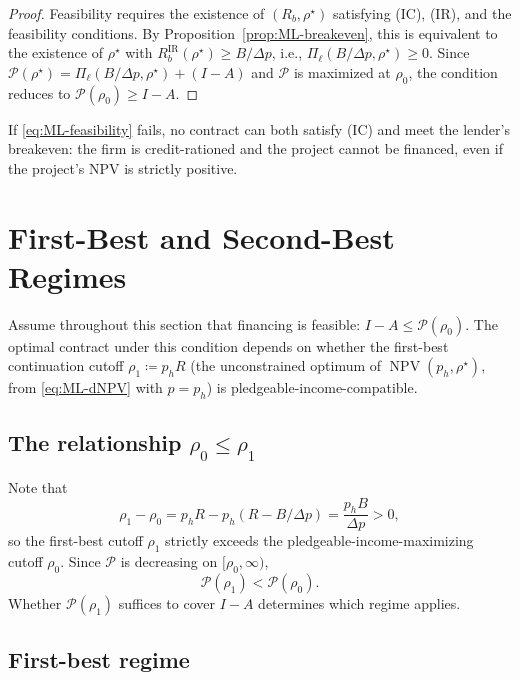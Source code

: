 \documentclass[11pt,a4paper,oneside]{book}
\def\leq{\leqslant}
\def\geq{\geqslant}
\DeclareMathOperator{\NPV}{NPV}
\newcommand{\IR}{\mathrm{IR}}
\theoremstyle{plain}
\theoremstyle{definition}
\theoremstyle{remark}
\numberwithin{equation}{chapter}
\begin{document}
\begin{proof}
Feasibility requires the existence of $(R_b, \rho^\star)$ satisfying (IC), (IR), and the feasibility conditions.
By Proposition~\ref{prop:ML-breakeven}, this is equivalent to the existence of $\rho^\star$ with $R_b^{\IR}(\rho^\star) \geq B/\Delta p$, i.e., $\Pi_\ell(B/\Delta p, \rho^\star) \geq 0$.
Since $\mathcal{P}(\rho^\star) = \Pi_\ell(B/\Delta p, \rho^\star) + (I - A)$ and $\mathcal{P}$ is maximized at $\rho_0$, the condition reduces to $\mathcal{P}(\rho_0) \geq I - A$.
\end{proof}

If \eqref{eq:ML-feasibility} fails, no contract can both satisfy (IC) and meet the lender's breakeven: the firm is credit-rationed and the project cannot be financed, even if the project's NPV is strictly positive.

\section{First-Best and Second-Best Regimes}
\label{sec:ML-regimes}

Assume throughout this section that financing is feasible: $I - A \leq \mathcal{P}(\rho_0)$.
The optimal contract under this condition depends on whether the first-best continuation cutoff $\rho_1 \coloneqq p_h R$ (the unconstrained optimum of $\NPV(p_h, \rho^\star)$, from \eqref{eq:ML-dNPV} with $p = p_h$) is pledgeable-income-compatible.

\subsection{The relationship $\rho_0 \leq \rho_1$}

Note that
\begin{equation*}
  \rho_1 - \rho_0 = p_h R - p_h(R - B/\Delta p) = \frac{p_h B}{\Delta p} > 0,
\end{equation*}
so the first-best cutoff $\rho_1$ strictly exceeds the pledgeable-income-maximizing cutoff $\rho_0$.
Since $\mathcal{P}$ is decreasing on $[\rho_0, \infty)$,
\begin{equation*}
  \mathcal{P}(\rho_1) < \mathcal{P}(\rho_0).
\end{equation*}
Whether $\mathcal{P}(\rho_1)$ suffices to cover $I - A$ determines which regime applies.

\subsection{First-best regime}
\end{document}
